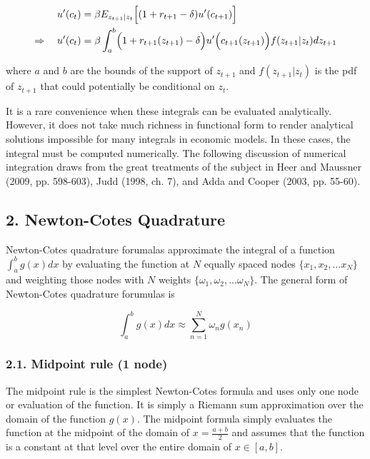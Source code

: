 \documentclass[11pt]{article}
\begin{document}
\begin{equation}\label{NumInt_EqEulEx}
  \begin{split}
    u'(c_t) &= \beta E_{z_{t+1}|z_t}\Bigl[(1+r_{t+1}-\delta)u'(c_{t+1})\Bigr] \\
    \Rightarrow\quad u'(c_t) &= \beta\int_a^b \Bigl(1+r_{t+1}(z_{t+1})-\delta\Bigr)u'\Bigl(c_{t+1}(z_{t+1})\Bigr)f(z_{t+1}|z_t)dz_{t+1}
  \end{split}
\end{equation}

where \(a\) and \(b\) are the bounds of the support of \(z_{t+1}\) and
\(f(z_{t+1}|z_t)\) is the pdf of \(z_{t+1}\) that could potentially be
conditional on \(z_t\).

It is a rare convenience when these integrals can be evaluated
analytically. However, it does not take much richness in functional form
to render analytical solutions impossible for many integrals in economic
models. In these cases, the integral must be computed numerically. The
following discussion of numerical integration draws from the great
treatments of the subject in Heer and Maussner (2009, pp. 598-603), Judd
(1998, ch. 7), and Adda and Cooper (2003, pp. 55-60).

    \subsection{2. Newton-Cotes Quadrature}\label{newton-cotes-quadrature}

Newton-Cotes quadrature forumalas approximate the integral of a function
\(\int_a^b g(x)dx\) by evaluating the function at \(N\) equally spaced
nodes \(\{x_1,x_2,...x_N\}\) and weighting those nodes with \(N\)
weights \(\{\omega_1,\omega_2,...\omega_N\}\). The general form of
Newton-Cotes quadrature forumulas is

\begin{equation}\label{NumInt_EqNewtCotesGen}
  \int_a^b g(x)dx \approx \sum_{n=1}^N\omega_n g(x_n)
\end{equation}

    \subsubsection{2.1. Midpoint rule (1 node)}\label{midpoint-rule-1-node}

The midpoint rule is the simplest Newton-Cotes formula and uses only one
node or evaluation of the function. It is simply a Riemann sum
approximation over the domain of the function \(g(x)\). The midpoint
formula simply evaluates the function at the midpoint of the domain of
\(x = \frac{a+b}{2}\) and assumes that the function is a constant at
that level over the entire domain of \(x\in[a,b]\).
\end{document}
